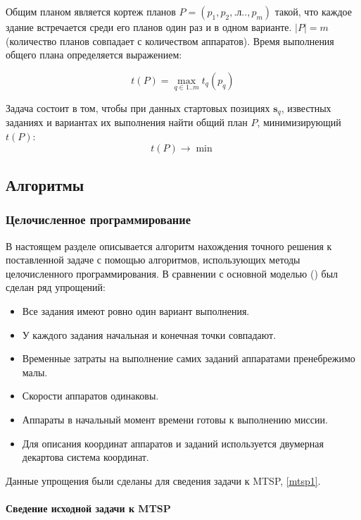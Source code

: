 \documentclass[a4paper,14pt,russian]{article}
\begin{document}
Общим планом является кортеж планов $P = (p_1, p_2, .л.., p_m)$ такой, что каждое здание встречается среди его планов один раз и в одном варианте. $|P| = m$ (количество планов совпадает с количеством аппаратов). Время выполнения общего плана определяется выражением:

\begin{equation} \label{varm2}
t(P) = \displaystyle \max_{q \in 1..m} t_q(p_q)
\end{equation}

Задача состоит в том, чтобы при данных стартовых позициях $\mathbf{s}_q$, известных заданиях и вариантах их выполнения найти общий план $P$, минимизирующий $t(P)$:
\begin{equation} \label{varm3}
t(P) \rightarrow \min
\end{equation}


\subsection{Алгоритмы}
\subsubsection{Целочисленное программирование}

В настоящем разделе описывается алгоритм нахождения точного решения к поставленной задаче с помощью алгоритмов, использующих методы целочисленного программирования. В сравнении с основной моделью () был сделан ряд упрощений:

\begin{itemize}
\item Все задания имеют ровно один вариант выполнения.
\item У каждого задания начальная и конечная точки совпадают.
\item Временные затраты на выполнение самих заданий аппаратами пренебрежимо малы.
\item Скорости аппаратов одинаковы.
\item Аппараты в начальный момент времени готовы к выполнению миссии.
\item Для описания координат аппаратов и заданий используется двумерная декартова система координат.
\end{itemize}
Данные упрощения были сделаны для сведения задачи к MTSP, \cref{mtsp1}.


\paragraph{Сведение исходной задачи к MTSP} ~\\
\end{document}
